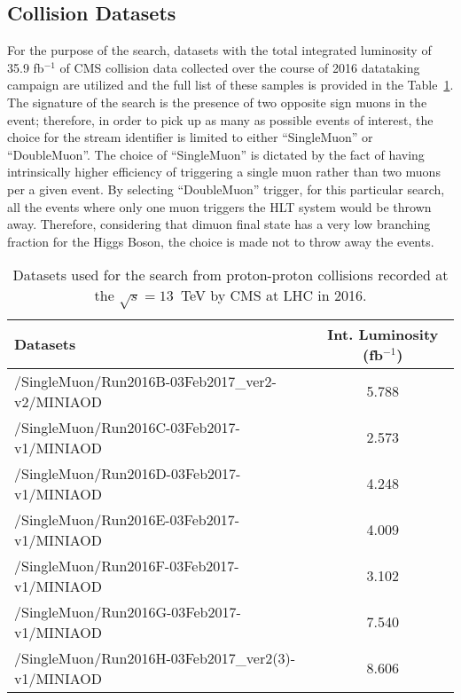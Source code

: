 \subsection{Collision Datasets}
For the purpose of the search, datasets with the total integrated luminosity of 35.9 fb$^{-1}$ of CMS collision data collected over the course of 2016 datataking campaign are utilized and the full list of these samples is provided in the Table~\ref{table:higgs_data_collisiondatasets}. The signature of the search is the presence of two opposite sign muons in the event; therefore, in order to pick up as many as possible events of interest, the choice for the stream identifier is limited to either ``SingleMuon'' or ``DoubleMuon''. The choice of ``SingleMuon'' is dictated by the fact of having intrinsically higher efficiency of triggering a single muon rather than two muons per a given event. By selecting ``DoubleMuon'' trigger, for this particular search, all the events where only one muon triggers the HLT system would be thrown away. Therefore, considering that dimuon final state has a very low branching fraction for the Higgs Boson, the choice is made not to throw away the events.
\begin{table}[htb]
    \caption{Datasets used for the search from proton-proton collisions recorded at the $\sqrt{s}=13$~TeV by CMS at LHC in 2016.}
    \label{table:higgs_data_collisiondatasets}
    \begin{center}
        \begin{tabular}{ l  c}
            \hline
            Datasets & Int. Luminosity (fb$^{-1}$)\\
            \hline
            {/SingleMuon/Run2016B-03Feb2017\_ver2-v2/MINIAOD} & 5.788\\
            {/SingleMuon/Run2016C-03Feb2017-v1/MINIAOD} & 2.573\\
            {/SingleMuon/Run2016D-03Feb2017-v1/MINIAOD} & 4.248\\
            {/SingleMuon/Run2016E-03Feb2017-v1/MINIAOD} & 4.009\\
            {/SingleMuon/Run2016F-03Feb2017-v1/MINIAOD} & 3.102\\
            {/SingleMuon/Run2016G-03Feb2017-v1/MINIAOD} & 7.540\\
            {/SingleMuon/Run2016H-03Feb2017\_ver2(3)-v1/MINIAOD} & 8.606\\
            \hline
        \end{tabular}
    \end{center}
\end{table}

